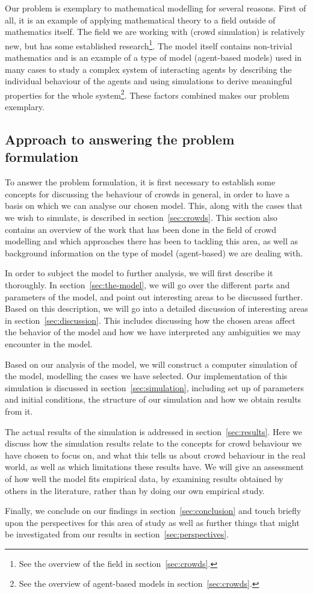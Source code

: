 Our problem is exemplary to mathematical modelling for several reasons. First 
of all, it is an example of applying mathematical theory to a field outside of 
mathematics itself. The field we are working with (crowd simulation) is 
relatively new, but has some established research\footnote{See the overview of 
the field in section~\ref{sec:crowds}.}. The model itself contains 
non-trivial mathematics and is an example of a type of model (agent-based 
models) used in many cases to study a complex system of interacting agents by 
describing the individual behaviour of the agents and using simulations to 
derive meaningful properties for the whole system\footnote{See the overview of 
agent-based models in section~\ref{sec:crowds}.}. These factors combined 
makes our problem exemplary.

\subsection{Approach to answering the problem formulation}
To answer the problem formulation, it is first necessary to establish some 
concepts for discussing the behaviour of crowds in general, in order to have a 
basis on which we can analyse our chosen model. This, along with the cases 
that we wish to simulate, is described in section~\ref{sec:crowds}. This 
section also contains an overview of the work that has been done in the field 
of crowd modelling and which approaches there has been to tackling this area, 
as well as background information on the type of model (agent-based) we are 
dealing with.

In order to subject the model to further analysis, we will first describe it 
thoroughly. In section~\ref{sec:the-model}, we will go over the different 
parts and parameters of the model, and point out interesting areas to be 
discussed further.  Based on this description, we will go into a detailed 
discussion of interesting areas in section~\ref{sec:discussion}.
This includes discussing how the chosen areas affect the behavior of the model and 
how we have interpreted any ambiguities we may encounter in the model.

Based on our analysis of the model, we will construct a computer simulation of 
the model, modelling the cases we have selected. Our implementation of this 
simulation is discussed in section~\ref{sec:simulation}, including set up of 
parameters and initial conditions, the structure of our simulation and how we 
obtain results from it.

The actual results of the simulation is addressed in 
section~\ref{sec:results}. Here we discuss how the simulation results relate 
to the concepts for crowd behaviour we have chosen to focus on, and what this 
tells us about crowd behaviour in the real world, as well as which limitations 
these results have.  We will give an assessment of how well the model fits 
empirical data, by examining results obtained by others in the literature, 
rather than by doing our own empirical study.

Finally, we conclude on our findings in section~\ref{sec:conclusion} and touch 
briefly upon the perspectives for this area of study as well as further things 
that might be investigated from our results in section~\ref{sec:perspectives}.
